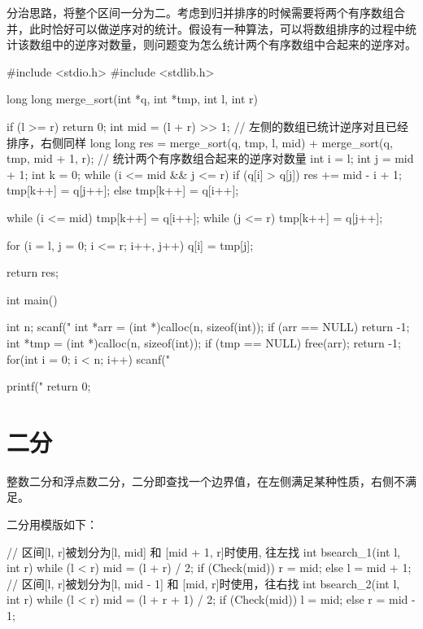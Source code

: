 分治思路，将整个区间一分为二。考虑到归并排序的时候需要将两个有序数组合并，此时恰好可以做逆序对的统计。假设有一种算法，可以将数组排序的过程中统计该数组中的逆序对数量，则问题变为怎么统计两个有序数组中合起来的逆序对。

\begin{mycpptwocol}[归并排序计算逆序对数量]
    #include <stdio.h>
    #include <stdlib.h>

    long long merge_sort(int *q, int *tmp, int l, int r)
    {
        if (l >= r) {
            return 0;
        }
        int mid = (l + r) >> 1;
        // 左侧的数组已统计逆序对且已经排序，右侧同样
        long long res = merge_sort(q, tmp, l, mid) + merge_sort(q, tmp, mid + 1, r);
        // 统计两个有序数组合起来的逆序对数量
        int i = l;
        int j = mid + 1;
        int k = 0;
        while (i <= mid && j <= r) {
            if (q[i] > q[j]) {
                res += mid - i + 1;
                tmp[k++] = q[j++];
            } else {
                tmp[k++] = q[i++];
            }
        }
        
        while (i <= mid) {
            tmp[k++] = q[i++];
        }
        while (j <= r) {
            tmp[k++] = q[j++];
        }
        
        for (i = l, j = 0; i <= r; i++, j++) {
            q[i] = tmp[j];
        }
        
        return res;
    }

    int main()
    {
        int n;
        scanf("%
        int *arr = (int *)calloc(n, sizeof(int));
        if (arr == NULL) {
            return -1;
        }
        int *tmp = (int *)calloc(n, sizeof(int));
        if (tmp == NULL) {
            free(arr);
            return -1;
        }
        for(int i = 0; i < n; i++) {
            scanf("%
        }
        
        printf("%
        return 0;
    }
\end{mycpptwocol}
\section{二分}
整数二分和浮点数二分，二分即查找一个边界值，在左侧满足某种性质，右侧不满足。

二分用模版如下：
\begin{mycpptwocol}[二分模版]
    // 区间[l, r]被划分为[l, mid] 和 [mid + 1, r]时使用, 往左找
    int bsearch_1(int l, int r)
    {
        while (l < r) {
            mid = (l + r) / 2;
            if (Check(mid)) {
                r = mid;
            } else {
                l = mid + 1;
            }
        }
    }
    // 区间[l, r]被划分为[l, mid - 1] 和 [mid, r]时使用，往右找
    int bsearch_2(int l, int r)
    {
        while (l < r) {
            mid = (l + r + 1) / 2;
            if (Check(mid)) {
                l = mid;
            } else {
                r = mid - 1;
            }
        }
    }
\end{mycpptwocol}

